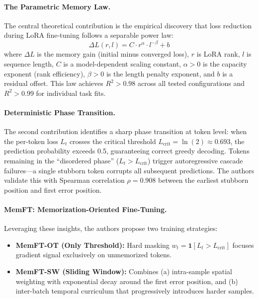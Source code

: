 \documentclass[11pt,a4paper]{article}
\begin{document}
\paragraph{The Parametric Memory Law.} The central theoretical contribution is the empirical discovery that loss reduction during LoRA fine-tuning follows a separable power law:
\begin{equation}
\Delta L(r, l) = C \cdot r^{\alpha} \cdot l^{-\beta} + b
\end{equation}
where $\Delta L$ is the memory gain (initial minus converged loss), $r$ is LoRA rank, $l$ is sequence length, $C$ is a model-dependent scaling constant, $\alpha > 0$ is the capacity exponent (rank efficiency), $\beta > 0$ is the length penalty exponent, and $b$ is a residual offset. This law achieves $R^2 > 0.98$ across all tested configurations and $R^2 > 0.99$ for individual task fits.

\paragraph{Deterministic Phase Transition.} The second contribution identifies a sharp phase transition at token level: when the per-token loss $L_t$ crosses the critical threshold $L_{\mathrm{crit}} = \ln(2) \approx 0.693$, the prediction probability exceeds 0.5, guaranteeing correct greedy decoding. Tokens remaining in the ``disordered phase'' ($L_t > L_{\mathrm{crit}}$) trigger autoregressive cascade failures---a single stubborn token corrupts all subsequent predictions. The authors validate this with Spearman correlation $\rho = 0.908$ between the earliest stubborn position and first error position.

\paragraph{MemFT: Memorization-Oriented Fine-Tuning.} Leveraging these insights, the authors propose two training strategies:
\begin{itemize}
\item \textbf{MemFT-OT (Only Threshold):} Hard masking $w_t = \mathbf{1}[L_t > L_{\mathrm{crit}}]$ focuses gradient signal exclusively on unmemorized tokens.
\item \textbf{MemFT-SW (Sliding Window):} Combines (a) intra-sample spatial weighting with exponential decay around the first error position, and (b) inter-batch temporal curriculum that progressively introduces harder samples.
\end{itemize}
\end{document}
